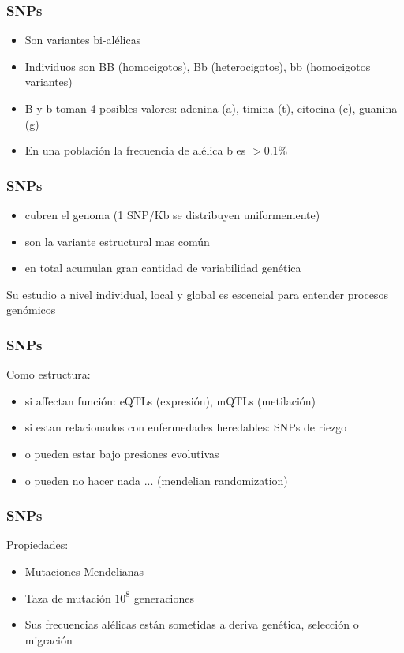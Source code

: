 \documentclass{beamer}\usepackage[]{graphicx}\usepackage[]{color}
\begin{document}
\begin{frame}[fragile] 
\frametitle{SNPs}

\begin{itemize}
  \item Son variantes bi-al\'elicas
  \item Individuos son BB (homocigotos), Bb (heterocigotos), bb (homocigotos variantes)
  \item B y b toman 4 posibles valores: adenina (a), timina (t), citocina (c), guanina (g)
 \item En una poblaci\'on la frecuencia de al\'elica b es $>0.1\%$ 
\end{itemize}
\end{frame}


\begin{frame}[fragile] 
\frametitle{SNPs}

\begin{itemize}
  \item cubren el genoma (1 SNP/Kb se distribuyen uniformemente)
  \item son la variante estructural mas com\'un 
 \item en total acumulan gran cantidad de variabilidad gen\'etica 
\end{itemize}

Su estudio a nivel individual, local y global es escencial para entender procesos gen\'omicos
\end{frame}

\begin{frame}[fragile] 
\frametitle{SNPs}

Como estructura: 

\begin{itemize}
  \item si affectan funci\'on: eQTLs (expresi\'on), mQTLs (metilaci\'on)
  \item si estan relacionados con enfermedades heredables: SNPs de riezgo 
  \item o pueden estar bajo presiones evolutivas  
  \item o pueden no hacer nada ... (mendelian randomization)
\end{itemize}

\end{frame}


\begin{frame}[fragile] 
\frametitle{SNPs}
Propiedades:

\begin{itemize}
  \item Mutaciones Mendelianas
  \item Taza de mutaci\'on $10^8$ generaciones
  \item Sus frecuencias al\'elicas est\'an sometidas a deriva gen\'etica, selecci\'on o migraci\'on 
\end{itemize}

\end{frame}
\end{document}
